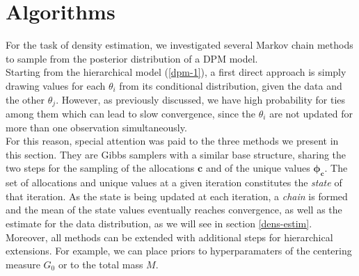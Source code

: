 \section{Algorithms}
For the task of density estimation, we investigated several Markov chain methods to sample from the posterior distribution of a DPM model. \\
Starting from the hierarchical model (\ref{dpm-1}), a first direct approach is simply drawing values for each $\theta_i$ from its conditional distribution, given the data and the other $\theta_j$.
However, as previously discussed, we have high probability for ties among them which can lead to slow convergence, since the $\theta_i$ are not updated for more than one observation simultaneously. \\
For this reason, special attention was paid to the three methods we present in this section.
They are Gibbs samplers with a similar base structure, sharing the two steps for the sampling of the allocations $\mathbf{c}$ and of the unique values $\mathbf{\phi_c}$.
The set of allocations and unique values at a given iteration constitutes the \emph{state} of that iteration.
As the state is being updated at each iteration, a \emph{chain} is formed and the mean of the state values eventually reaches convergence, as well as the estimate for the data distribution, as we will see in section \ref{dens-estim}.
Moreover, all methods can be extended with additional steps for hierarchical extensions.
For example, we can place priors to hyperparamaters of the centering measure $G_0$ or to the total mass $M$.

